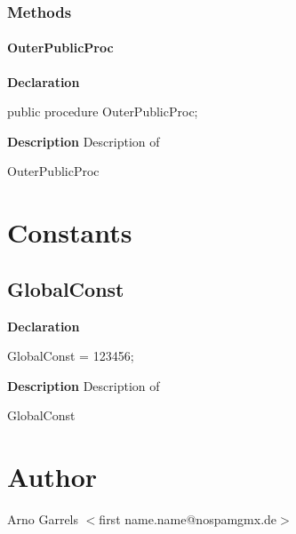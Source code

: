 \documentclass{report}
\begin{document}
\subsubsection*{\large{\textbf{Methods}}\normalsize\hspace{1ex}\hfill}
\paragraph*{OuterPublicProc}\hspace*{\fill}

\begin{list}{}{
\setlength{\itemindent}{0cm}
\setlength{\listparindent}{0cm}
\setlength{\leftmargin}{\evensidemargin}
\addtolength{\leftmargin}{\tmplength}
\settowidth{\labelsep}{X}
\addtolength{\leftmargin}{\labelsep}
\setlength{\labelwidth}{\tmplength}
}
\begin{flushleft}
\item[\textbf{Declaration}\hfill]
\begin{ttfamily}
public procedure OuterPublicProc;\end{ttfamily}


\end{flushleft}
\par
\item[\textbf{Description}]
Description of \begin{ttfamily}OuterPublicProc\end{ttfamily}

\end{list}
\section{Constants}
\subsection*{GlobalConst}
\begin{list}{}{
\setlength{\itemindent}{0cm}
\setlength{\listparindent}{0cm}
\setlength{\leftmargin}{\evensidemargin}
\addtolength{\leftmargin}{\tmplength}
\settowidth{\labelsep}{X}
\addtolength{\leftmargin}{\labelsep}
\setlength{\labelwidth}{\tmplength}
}
\begin{flushleft}
\item[\textbf{Declaration}\hfill]
\begin{ttfamily}
GlobalConst = 123456;\end{ttfamily}


\end{flushleft}
\par
\item[\textbf{Description}]
Description of \begin{ttfamily}GlobalConst\end{ttfamily}

\end{list}
\section{Author}
\par
Arno Garrels {$<$}first name.name@nospamgmx.de{$>$}
\end{document}
